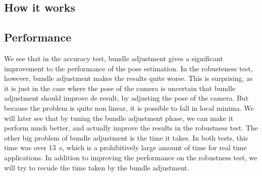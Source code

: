 \subsection{How it works}

\subsection{Performance}
%
We see that in the accuracy test, bundle adjustment gives a significant improvement to the performance of the pose estimation. In the robusteness test, however, bundle adjustment makes the results quite worse. This is surprising, as it is just in the case where the pose of the camera is uncertain that bundle adjustment should improve de result, by adjusting the pose of the camera. But because the problem is quite non linear, it is possible to fall in local minima. We will later see that by tuning the bundle adjustment phase, we can make it perform much better, and actually improve the results in the robustness test. The other big problem of bundle adjustment is the time it takes. In both tests, this time was over \SI{13}{\second}, which is a prohibitively large amount of time for real time applications. In addition to improving the performance on the robustness test, we will try to recude the time taken by the bundle adjustment.



